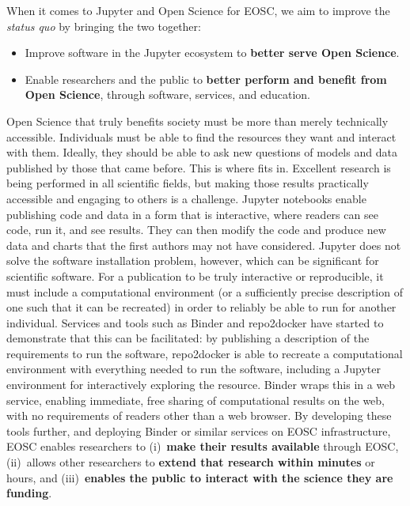 When it comes to Jupyter and Open Science for EOSC, we aim to improve the
\textit{status quo} by bringing the two together:

\begin{itemize}
\item Improve software in the Jupyter ecosystem to \textbf{better serve Open
  Science}.
\item Enable researchers and the public to \textbf{better perform and benefit
  from Open Science}, through software, services, and education.
\end{itemize}

Open Science that truly benefits society must be more than merely
technically accessible.  Individuals must be able to find the
resources they want and interact with them.  Ideally, they should be
able to ask new questions of models and data published by those that
came before.  This is where \TheProject fits in.  Excellent research
is being performed in all scientific fields, but making those results
practically accessible and engaging to others is a challenge.
Jupyter notebooks enable publishing code and data in a form that is
interactive, where readers can see code, run it, and see results.
They can then modify the code and produce new data and charts that the
first authors may not have considered.  Jupyter does not solve the
software installation problem, however, which can be significant for
scientific software.  For a publication to be truly interactive or
reproducible, it must include a computational environment (or a
sufficiently precise description of one such that it can be recreated)
in order to reliably be able to run for another individual.  Services
and tools such as Binder and repo2docker have started to demonstrate
that this can be facilitated: by
publishing a description of the requirements to run the software,
repo2docker is able to recreate a computational environment with
everything needed to run the software, including a Jupyter
environment for interactively exploring the resource.  Binder wraps
this in a web service, enabling immediate, free sharing of
computational results on the web, with no requirements of readers
other than a web browser.  By developing these tools further, and deploying Binder or similar services on
EOSC infrastructure, EOSC enables researchers to
(i)~\textbf{make their results available} through EOSC,
(ii)~allows other researchers to \textbf{extend that research within minutes} or hours,
and (iii)~\textbf{enables the public to interact with the
science they are funding}.

